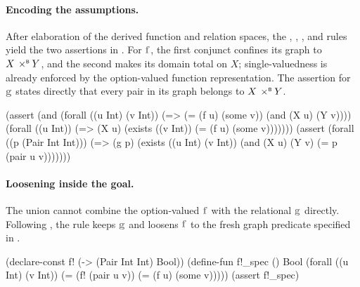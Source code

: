 \paragraph{Encoding the assumptions.}
After elaboration of the derived function and relation spaces, the , , , and  rules yield the two assertions in .
For \(\var{f}\), the first conjunct confines its graph to \(X\mathbin{\,\times^{\scriptscriptstyle{\mathsf{B}}}} Y\), and the second makes its domain total on \(X\); single-valuedness is already enforced by the option-valued function representation.
The assertion for \(\var{g}\) states directly that every pair in its graph belongs to \(X\mathbin{\,\times^{\scriptscriptstyle{\mathsf{B}}}} Y\).

\begin{smtlisting}[title={Encoded assumptions.}, label=lst:beer-running-assumptions, float=h]
(assert
  (and
    (forall ((u Int) (v Int))
      (=> (= (f u) (some v)) (and (X u) (Y v))))
    (forall ((u Int))
      (=> (X u) (exists ((v Int)) (= (f u) (some v)))))))
(assert
  (forall ((p (Pair Int Int)))
    (=> (g p)
      (exists ((u Int) (v Int))
        (and (X u) (Y v) (= p (pair u v)))))))
\end{smtlisting}

\paragraph{Loosening inside the goal.}
The union cannot combine the option-valued \(\var{f}\) with the relational \(\var{g}\) directly.
Following , the  rule keeps \(\var{g}\) and loosens \(\var{f}\) to the fresh graph predicate  specified in .

\begin{smtlisting}[title={Loosening to a graph.}, label=lst:beer-running-loosening, float=h]
(declare-const f! (-> (Pair Int Int) Bool))
(define-fun f!_spec () Bool
  (forall ((u Int) (v Int))
    (= (f! (pair u v)) (= (f u) (some v)))))
(assert f!_spec)
\end{smtlisting}

